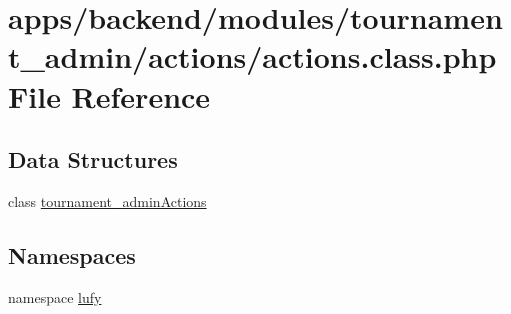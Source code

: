 \hypertarget{backend_2modules_2tournament__admin_2actions_2actions_8class_8php}{\section{apps/backend/modules/tournament\-\_\-admin/actions/actions.class.\-php File Reference}
\label{backend_2modules_2tournament__admin_2actions_2actions_8class_8php}
}
\subsection*{Data Structures}
\begin{DoxyCompactItemize}
\item 
class \hyperlink{classtournament__admin_actions}{tournament\-\_\-admin\-Actions}
\end{DoxyCompactItemize}
\subsection*{Namespaces}
\begin{DoxyCompactItemize}
\item 
namespace \hyperlink{namespacelufy}{lufy}
\end{DoxyCompactItemize}
